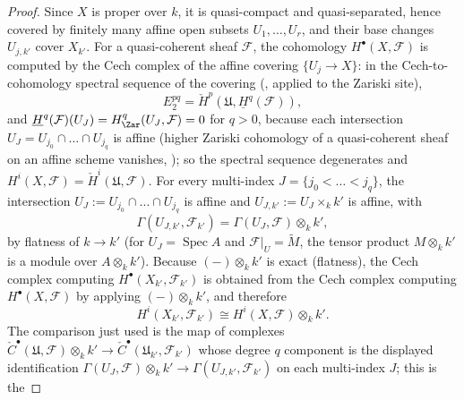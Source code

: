 \begin{proof}
Since \(X\) is proper over \(k\), it is quasi-compact and
quasi-separated, hence covered by finitely many affine open subsets
\(U_1,\dots,U_r\), and their base changes \(U_{j,k'}\) cover
\(X_{k'}\).  For a quasi-coherent sheaf \(\mathcal F\), the cohomology
\(H^\bullet(X,\mathcal F)\) is computed by the Cech complex of the
affine covering \(\{U_j\to X\}\): in the Cech-to-cohomology spectral
sequence of the covering (, applied to
the Zariski site),
\[
 E_2^{pq}=\check H^p(\mathfrak U,\underline H^q(\mathcal F)),
\]
and \(\underline H^q(\mathcal F)(U_J)=H^q_{\Zar}(U_J,\mathcal F)=0\)
for \(q>0\), because each intersection
\(U_J=U_{j_0}\cap\dots\cap U_{j_q}\) is affine (higher Zariski
cohomology of a quasi-coherent sheaf on an affine scheme vanishes,
);
so the spectral sequence degenerates and
\(H^i(X,\mathcal F)=\check H^i(\mathfrak U,\mathcal F)\).  For every multi-index \(J=\{j_0<\dots<j_q\}\), the
intersection \(U_J:=U_{j_0}\cap\dots\cap U_{j_q}\) is affine and
\(U_{J,k'}:=U_J\times_kk'\) is affine, with
\[
 \Gamma(U_{J,k'},\mathcal F_{k'})
 =\Gamma(U_J,\mathcal F)\otimes_kk',
\]
by flatness of \(k\to k'\) (for \(U_J=\operatorname{Spec}A\) and
\(\mathcal F|_U=\widetilde M\), the tensor product \(M\otimes_kk'\)
is a module over \(A\otimes_kk'\)).  Because \((-)\otimes_kk'\) is
exact (flatness), the Cech complex computing
\(H^\bullet(X_{k'},\mathcal F_{k'})\) is obtained from the Cech
complex computing \(H^\bullet(X,\mathcal F)\) by applying
\((-)\otimes_kk'\), and therefore
\[
 H^i(X_{k'},\mathcal F_{k'})\cong H^i(X,\mathcal F)\otimes_kk'.
\]
The comparison just used is the map of complexes
\(\check C^\bullet(\mathfrak U,\mathcal F)\otimes_kk'\to
\check C^\bullet(\mathfrak U_{k'},\mathcal F_{k'})\) whose degree \(q\)
component is the displayed identification
\(\Gamma(U_J,\mathcal F)\otimes_kk'\to
\Gamma(U_{J,k'},\mathcal F_{k'})\) on each multi-index \(J\); this is the

\end{proof}

